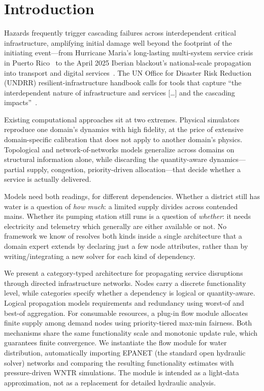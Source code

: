 \documentclass{svproc}
\begin{document}
\section{Introduction}\label{sec:intro}

Hazards frequently trigger cascading failures across interdependent
critical infrastructure, amplifying initial damage well beyond the
footprint of the initiating event---from Hurricane Maria's long-lasting
multi-system service crisis in Puerto Rico~\cite{hurricane_maria} to the
April 2025 Iberian blackout's national-scale propagation into transport
and digital services~\cite{panel2025grid}. The UN Office for Disaster Risk Reduction (UNDRR) resilient-infrastructure handbook
calls for tools that capture ``the interdependent nature of infrastructure and services
[\ldots] and the cascading impacts''~\cite{UNDRR2023Handbook}.

Existing computational approaches sit at two extremes. Physical simulators reproduce one
domain's dynamics with high fidelity, at the price of extensive domain-specific
calibration that does not apply to another domain's physics. Topological and
network-of-networks models generalize across domains on structural information alone, while
discarding the quantity-aware dynamics---partial supply, congestion, priority-driven
allocation---that decide whether a service is actually delivered.

Models need both readings, for different dependencies. Whether a district still
has water is a question of \emph{how much}: a limited supply divides across contended
mains. Whether its pumping station still runs is a question of \emph{whether}: it needs
electricity and telemetry which generally are either available or not. No framework we know of
resolves both kinds inside a single architecture that a domain expert extends by
declaring just a few node attributes, rather than by writing/integrating a new solver for each kind of
dependency.

We present a category-typed architecture for propagating service
disruptions through directed infrastructure networks. Nodes carry a
discrete functionality level, while categories specify whether a
dependency is logical or quantity-aware. Logical propagation models
requirements and redundancy using worst-of and best-of aggregation.
For consumable resources, a plug-in flow module allocates finite supply
among demand nodes using priority-tiered max-min fairness. Both
mechanisms share the same functionality scale and monotonic update rule,
which guarantees finite convergence. We instantiate the flow module for
water distribution, automatically importing EPANET (the standard open hydraulic solver) networks and
comparing the resulting functionality estimates with pressure-driven
WNTR simulations. The module is intended as a light-data approximation,
not as a replacement for detailed hydraulic analysis.
\end{document}
